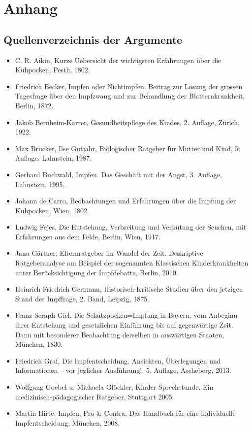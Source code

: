 \documentclass[
    a4paper,
    12pt,
    hyphens,
    chapterprefix=true,
    headheight=33pt,
    footheight=29pt,
    headings=optiontohead, %
]{scrartcl}
\begin{document}
{\section{Anhang}

\subsection{Quellenverzeichnis der Argumente}
\begin{itemize}
\item{C. R. Aikin, Kurze Uebersicht der wichtigsten Erfahrungen über die Kuhpocken, Pesth, 1802.}
\item{Friedrich Becker, Impfen oder Nichtimpfen. Beitrag zur Lösung der grossen Tagesfrage über den Impfzwang und zur Behandlung der Blatternkrankheit, Berlin, 1872.}
\item{Jakob Bernheim-Karrer, Gesundheitspflege des Kindes, 2. Auflage, Zürich, 1922.}
\item{Max Brucker, Ilse Gutjahr, Biologischer Ratgeber für Mutter und Kind, 5. Auflage, Lahnstein, 1987.}
\item{Gerhard Buchwald, Impfen. Das Geschäft mit der Angst, 3. Auflage, Lahnstein, 1995.}
\item{Johann de Carro, Beobachtungen und Erfahrungen über die Impfung der Kuhpocken, Wien, 1802.}
\item{Ludwig Fejes, Die Entstehung, Verbreitung und Verhütung der Seuchen, mit Erfahrungen aus dem Felde, Berlin, Wien, 1917.}
\item{Jana Gärtner, Elternratgeber im Wandel der Zeit. Deskriptive Ratgeberanalyse am Beispiel der sogenannten Klassischen Kinderkrankheiten unter Berücksichtigung der Impfdebatte, Berlin, 2010.}
\item{Heinrich Friedrich Germann, Historisch-Kritische Studien über den jetzigen Stand der Impffrage, 2. Band, Leipzig, 1875.}
\item{Franz Seraph Giel, Die Schutzpocken=Impfung in Bayern, vom Anbeginn ihrer Entstehung und gesetzlichen Einführung  bis auf gegenwärtige Zeit. Dann mit besonderer Beobachtung derselben in auswärtigen Staaten, München, 1830.}
\item{Friedrich Graf, Die Impfentscheidung. Ansichten, Überlegungen und Informationen -- vor jeglicher Ausführung!, 5. Auflage, Ascheberg, 2013.}
\item{Wolfgang Goebel u. Michaela Glöckler, Kinder Sprechstunde. Ein medizinisch-pädagogischer Ratgeber, Stuttgart 2005.}
\item{Martin Hirte, Impfen, Pro \& Contra. Das Handbuch für eine individuelle \\Impfentscheidung, München, 2008.}

\end{itemize}}
\end{document}
